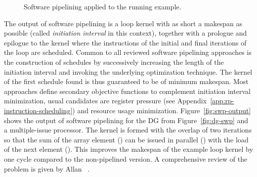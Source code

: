 \documentclass[acmsmall,authorversion,nonacm]{acmart}
\begin{document}
\begin{figure}
{{{\begin{tikzpicture}
\end{tikzpicture}
 }}
    \label{fig:swp-output}
  }
  \hfill
  \caption{Software pipelining applied to the running example.}
  \label{fig:software-pipelining}
\end{figure}

The output of software pipelining is a loop kernel with as short a
makespan as possible (called \emph{initiation interval} in this
context), together with a prologue and epilogue to the kernel where
the instructions of the initial and final iterations of the loop are
scheduled.
Common to all reviewed software pipelining approaches is the
construction of schedules by successively increasing the length of the
initiation interval and invoking the underlying optimization
technique.
The kernel of the first schedule found is thus guaranteed to be of
minimum makespan.
Most approaches define secondary objective functions to complement
initiation interval minimization, usual candidates are register
pressure (see Appendix~\ref{app:rp-instruction-scheduling}) and
resource usage minimization.
Figure~\ref{fig:swp-output} shows the output of software pipelining
for the DG from Figure~\ref{fig:dg-swp} and a multiple-issue
processor.
The kernel is formed with the overlap of two iterations so that the
sum of the array element () can be issued in parallel
() with the load of the next element ().
This improves the makespan of the example loop kernel by one cycle
compared to the non-pipelined version.
A comprehensive review of the problem is given by Allan
\etal{}~\cite{Allan1995}.
\end{document}
